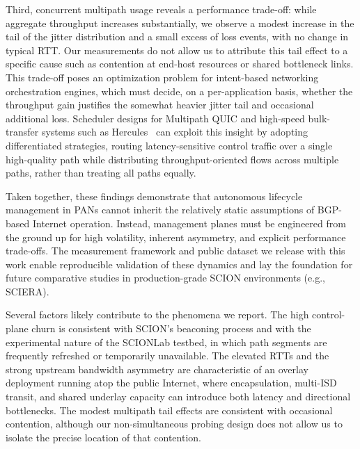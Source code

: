 \documentclass[pdflatex,sn-vancouver-num]{sn-jnl}%
\theoremstyle{thmstyleone}%
\theoremstyle{thmstyletwo}%
\theoremstyle{thmstylethree}%
\begin{document}
Third, concurrent multipath usage reveals a performance trade-off: while aggregate throughput increases substantially, we observe a modest increase in the tail of the jitter distribution and a small excess of loss events, with no change in typical RTT. Our measurements do not allow us to attribute this tail effect to a specific cause such as contention at end-host resources or shared bottleneck links. This trade-off poses an optimization problem for intent-based networking orchestration engines, which must decide, on a per-application basis, whether the throughput gain justifies the somewhat heavier jitter tail and occasional additional loss. Scheduler designs for Multipath QUIC and high-speed bulk-transfer systems such as Hercules~\cite{gartner2023hercules} can exploit this insight by adopting differentiated strategies, routing latency-sensitive control traffic over a single high-quality path while distributing throughput-oriented flows across multiple paths, rather than treating all paths equally.

Taken together, these findings demonstrate that autonomous lifecycle management in PANs cannot inherit the relatively static assumptions of BGP-based Internet operation. Instead, management planes must be engineered from the ground up for high volatility, inherent asymmetry, and explicit performance trade-offs. The measurement framework and public dataset we release with this work enable reproducible validation of these dynamics and lay the foundation for future comparative studies in production-grade SCION environments (e.g., SCIERA).

Several factors likely contribute to the phenomena we report. The high control-plane churn is consistent with SCION's beaconing process and with the experimental nature of the SCIONLab testbed, in which path segments are frequently refreshed or temporarily unavailable. The elevated RTTs and the strong upstream bandwidth asymmetry are characteristic of an overlay deployment running atop the public Internet, where encapsulation, multi-ISD transit, and shared underlay capacity can introduce both latency and directional bottlenecks. The modest multipath tail effects are consistent with occasional contention, although our non-simultaneous probing design does not allow us to isolate the precise location of that contention.
\end{document}
